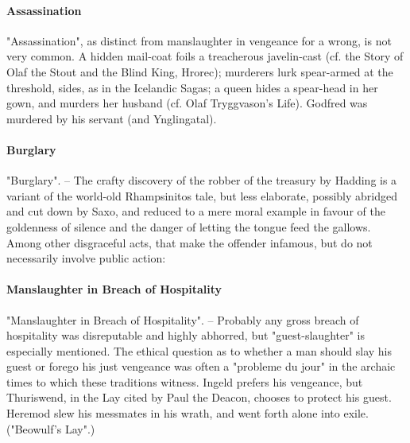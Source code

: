 \documentclass[10pt,a4paper]{report}
\begin{document}
\paragraph*{Assassination}
"Assassination", as distinct from manslaughter in vengeance for a wrong, is not very common. A hidden mail-coat foils a treacherous javelin-cast (cf. the Story of Olaf the Stout and the Blind King, Hrorec); murderers lurk spear-armed at the threshold, sides, as in the Icelandic Sagas; a queen hides a spear-head in her gown, and murders her husband (cf. Olaf Tryggvason's Life). Godfred was murdered by his servant (and Ynglingatal).\\

\paragraph*{Burglary}
"Burglary". -- The crafty discovery of the robber of the treasury by Hadding is a variant of the world-old Rhampsinitos tale, but less elaborate, possibly abridged and cut down by Saxo, and reduced to a mere moral example in favour of the goldenness of silence and the danger of letting the tongue feed the gallows.\\

Among other disgraceful acts, that make the offender infamous, but do not necessarily involve public action:\\

\paragraph*{Manslaughter in Breach of Hospitality}
"Manslaughter in Breach of Hospitality". -- Probably any gross breach of hospitality was disreputable and highly abhorred, but "guest-slaughter" is especially mentioned. The ethical question as to whether a man should slay his guest or forego his just vengeance was often a "probleme du jour" in the archaic times to which these traditions witness. Ingeld prefers his vengeance, but Thuriswend, in the Lay cited by Paul the Deacon, chooses to protect his guest. Heremod slew his messmates in his wrath, and went forth alone into exile. ("Beowulf's Lay".)\\
\end{document}
